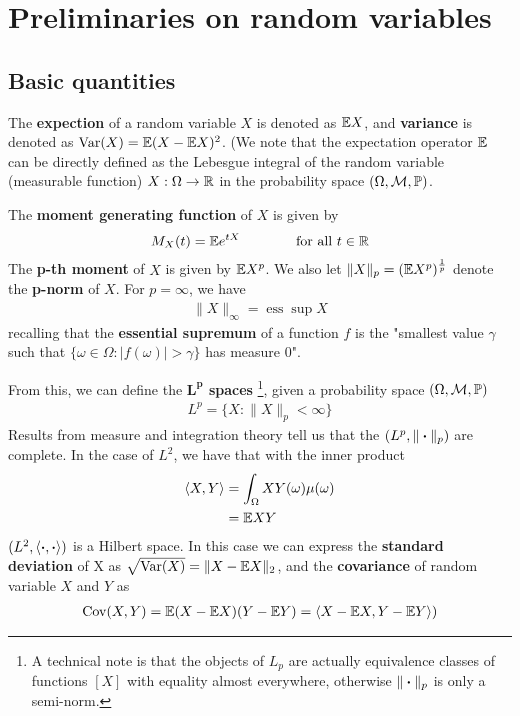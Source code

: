 \section{Preliminaries on random variables}
\subsection{Basic quantities}

The \textbf{expection} of a random variable $X$ is denoted as $\mathbb{E} X$, and \textbf{variance} is denoted as $\text{Var}(X) = \mathbb{E} (X - \mathbb{E} X)^2$. 
(We note that the expectation operator $\mathbb{E}$ can be directly defined as the Lebesgue integral of the random variable (measurable function) $X: \Omega \rightarrow \mathbb{R}$ in the probability space $(\Omega, \mathcal{M}, \mathbb{P})$.

The \textbf{moment generating function} of $X$ is given by
\begin{align*}
    M_X(t) = \mathbb{E} e^{tX} \qquad\qquad\text{for all $t\in \mathbb{R}$}
\end{align*}
The \textbf{p-th moment} of $X$ is given by $\mathbb{E} X^p$. We also let $\|X\|_p = ( \mathbb{E} X^p )^{\frac{1}{p}}$ denote the \textbf{p-norm} of $X$. For $p=\infty$, we have
\begin{align}
    \|X\|_\infty = \operatorname{ess}\operatorname{sup}X \nonumber
\end{align}
recalling that the \textbf{essential supremum} of a function $f$ is the "smallest value $\gamma$ such that $\{\omega \in \Omega: |f(\omega)| > \gamma \}$ has measure 0".

From this, we can define the \textbf{$\boldsymbol{L^p}$ spaces}%
\footnote{A technical note is that the objects of $L_p$ are actually equivalence classes of functions $[X]$ with equality almost everywhere, otherwise $\|\boldsymbol{\cdot}\|_p$ is only a semi-norm.},
given a probability space $(\Omega, \mathcal{M}, \mathbb{P})$
\begin{align*}
    L^p = \{X : \|X\|_p < \infty\}
\end{align*}
Results from measure and integration theory tell us that the $(L^p, \|\boldsymbol{\cdot}\|_p)$ are complete. In the case of $L^2$, we have that with the inner product
\begin{align*}
    \langle X,Y \rangle &= \int_\Omega{XY(\omega)\mu(\omega)} \\
    &= \mathbb{E} XY
\end{align*}
$(L^2, \langle \boldsymbol{\cdot},\boldsymbol{\cdot} \rangle)$ is a Hilbert space. In this case we can express the \textbf{standard deviation} of X as $\sqrt{\operatorname{Var}(X)} = \|X - \mathbb{E} X\|_2$, and the \textbf{covariance} of random variable $X$ and $Y$ as
\begin{align*}
    \operatorname{Cov}(X,Y) = \mathbb{E} (X - \mathbb{E} X)(Y - \mathbb{E} Y) = \langle X - \mathbb{E} X, Y - \mathbb{E} Y\rangle )
\end{align*}

